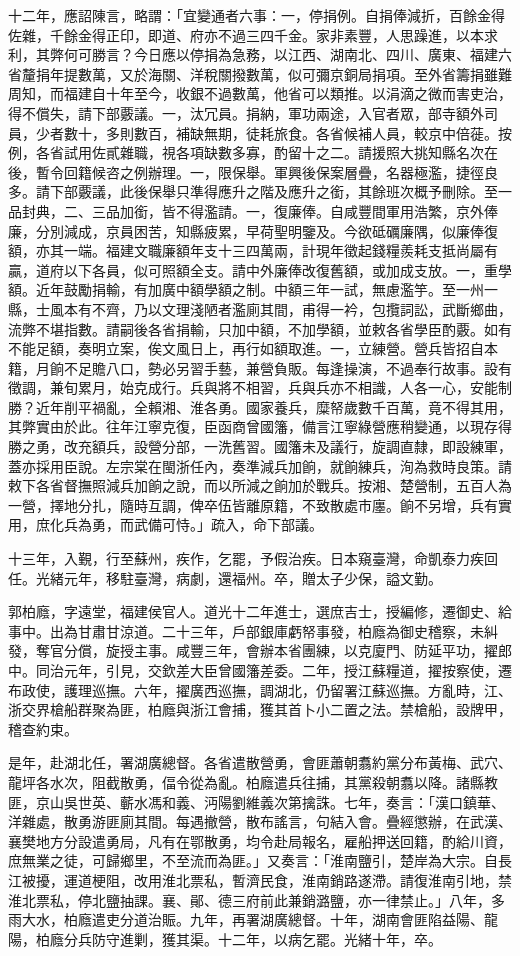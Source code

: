 \begin{pinyinscope}
十二年，應詔陳言，略謂：「宜變通者六事：一，停捐例。自捐俸減折，百餘金得佐雜，千餘金得正印，即道、府亦不過三四千金。家非素豐，人思躁進，以本求利，其弊何可勝言？今日應以停捐為急務，以江西、湖南北、四川、廣東、福建六省釐捐年提數萬，又於海關、洋稅關撥數萬，似可彌京銅局捐項。至外省籌捐雖難周知，而福建自十年至今，收銀不過數萬，他省可以類推。以涓滴之微而害吏治，得不償失，請下部覈議。一，汰冗員。捐納，軍功兩途，入官者眾，部寺額外司員，少者數十，多則數百，補缺無期，徒耗旅食。各省候補人員，較京中倍蓰。按例，各省試用佐貳雜職，視各項缺數多寡，酌留十之二。請援照大挑知縣名次在後，暫令回籍候咨之例辦理。一，限保舉。軍興後保案層疊，名器極濫，捷徑良多。請下部覈議，此後保舉只準得應升之階及應升之銜，其餘班次概予刪除。至一品封典，二、三品加銜，皆不得濫請。一，復廉俸。自咸豐間軍用浩繁，京外俸廉，分別減成，京員困苦，知縣疲累，早荷聖明鑒及。今欲砥礪廉隅，似廉俸復額，亦其一端。福建文職廉額年支十三四萬兩，計現年徵起錢糧羨耗支抵尚屬有贏，道府以下各員，似可照額全支。請中外廉俸改復舊額，或加成支放。一，重學額。近年鼓勵捐輸，有加廣中額學額之制。中額三年一試，無慮濫竽。至一州一縣，士風本有不齊，乃以文理淺陋者濫廁其間，甫得一衿，包攬詞訟，武斷鄉曲，流弊不堪指數。請嗣後各省捐輸，只加中額，不加學額，並敕各省學臣酌覈。如有不能足額，奏明立案，俟文風日上，再行如額取進。一，立練營。營兵皆招自本籍，月餉不足贍八口，勢必另習手藝，兼營負販。每逢操演，不過奉行故事。設有徵調，兼旬累月，始克成行。兵與將不相習，兵與兵亦不相識，人各一心，安能制勝？近年削平禍亂，全賴湘、淮各勇。國家養兵，糜帑歲數千百萬，竟不得其用，其弊實由於此。往年江寧克復，臣函商曾國籓，備言江寧綠營應稍變通，以現存得勝之勇，改充額兵，設營分部，一洗舊習。國籓未及議行，旋調直隸，即設練軍，蓋亦採用臣說。左宗棠在閩浙任內，奏準減兵加餉，就餉練兵，洵為救時良策。請敕下各省督撫照減兵加餉之說，而以所減之餉加於戰兵。按湘、楚營制，五百人為一營，擇地分扎，隨時互調，俾卒伍皆離原籍，不致散處市廛。餉不另增，兵有實用，庶化兵為勇，而武備可恃。」疏入，命下部議。

十三年，入覲，行至蘇州，疾作，乞罷，予假治疾。日本窺臺灣，命凱泰力疾回任。光緒元年，移駐臺灣，病劇，還福州。卒，贈太子少保，謚文勤。

郭柏廕，字遠堂，福建侯官人。道光十二年進士，選庶吉士，授編修，遷御史、給事中。出為甘肅甘涼道。二十三年，戶部銀庫虧帑事發，柏廕為御史稽察，未糾發，奪官分償，旋授主事。咸豐三年，會辦本省團練，以克廈門、防延平功，擢郎中。同治元年，引見，交欽差大臣曾國籓差委。二年，授江蘇糧道，擢按察使，遷布政使，護理巡撫。六年，擢廣西巡撫，調湖北，仍留署江蘇巡撫。方亂時，江、浙交界槍船群聚為匪，柏廕與浙江會捕，獲其首卜小二置之法。禁槍船，設牌甲，稽查約束。

是年，赴湖北任，署湖廣總督。各省遣散營勇，會匪蕭朝翥約黨分布黃梅、武穴、龍坪各水次，阻截散勇，偪令從為亂。柏廕遣兵往捕，其黨殺朝翥以降。諸縣教匪，京山吳世英、蘄水馮和義、沔陽劉維義次第擒誅。七年，奏言：「漢口鎮華、洋雜處，散勇游匪廁其間。每遇撤營，散布謠言，句結入會。疊經懲辦，在武漢、襄樊地方分設遣勇局，凡有在鄂散勇，均令赴局報名，雇船押送回籍，酌給川資，庶無業之徒，可歸鄉里，不至流而為匪。」又奏言：「淮南鹽引，楚岸為大宗。自長江被擾，運道梗阻，改用淮北票私，暫濟民食，淮南銷路遂滯。請復淮南引地，禁淮北票私，停北鹽抽課。襄、鄖、德三府前此兼銷潞鹽，亦一律禁止。」八年，多雨大水，柏廕遣吏分道治賑。九年，再署湖廣總督。十年，湖南會匪陷益陽、龍陽，柏廕分兵防守進剿，獲其渠。十二年，以病乞罷。光緒十年，卒。


\end{pinyinscope}
